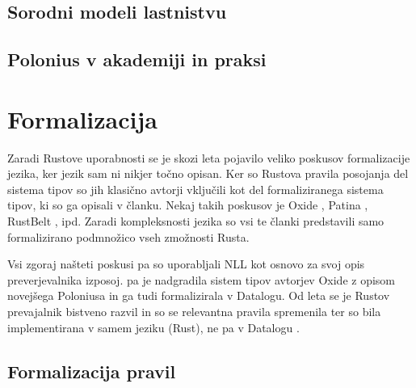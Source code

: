 \documentclass{article}
\begin{document}

\subsection{Sorodni modeli lastnistvu}


\subsection{Polonius v akademiji in praksi}



\section{Formalizacija}


Zaradi Rustove uporabnosti se je skozi leta pojavilo veliko poskusov formalizacije jezika, ker jezik sam
ni nikjer točno opisan. Ker so Rustova pravila posojanja del sistema tipov so jih klasično avtorji
vključili kot del formaliziranega sistema tipov, ki so ga opisali v članku. Nekaj takih poskusov je Oxide \cite{weissOxideEssenceRust2019},
Patina \cite{reedPatinaFormalizationRust}, RustBelt \cite{jungRustBeltSecuringFoundations2018}, ipd.
Zaradi kompleksnosti jezika so vsi te članki predstavili samo formalizirano podmnožico vseh
zmožnosti Rusta.

Vsi zgoraj našteti poskusi pa so uporabljali NLL kot osnovo za svoj opis preverjevalnika izposoj.
\citeauthor{stjernaModellingRustsReference} pa je nadgradila sistem tipov avtorjev Oxide z opisom
novejšega Poloniusa in ga tudi formalizirala v Datalogu. Od leta \citeyear{stjernaModellingRustsReference} se
je Rustov prevajalnik bistveno razvil in so se relevantna pravila spremenila ter so bila implementirana
v samem jeziku (Rust), ne pa v Datalogu \cite{RustCompilerRustc_borrowck}.


\subsection{Formalizacija pravil}
\end{document}
